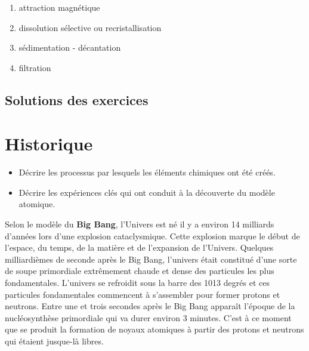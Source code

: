 \documentclass[
  11pt,
  a4paper,
  openany]{book}
\providecommand{\tightlist}{%
  \setlength{\itemsep}{0pt}\setlength{\parskip}{0pt}}
\begin{document}
\begin{Answer}

\begin{enumerate}
\def\labelenumi{\arabic{enumi}.}
\tightlist
\item
  attraction magnétique
\item
  dissolution sélective ou recristallisation
\item
  sédimentation - décantation
\item
  filtration
\end{enumerate}

\end{Answer}

\newpage

\section{Solutions des exercices} \shipoutAnswer

\chapter{Historique}\label{historique}

\begin{objectives}

\begin{itemize}
\tightlist
\item
  Décrire les processus par lesquels les éléments chimiques ont été créés.
\item
  Décrire les expériences clés qui ont conduit à la découverte du modèle atomique.
\end{itemize}

\end{objectives}

Selon le modèle du \textbf{Big Bang}, l'Univers est né il y a environ 14 milliards d'années lors d'une explosion cataclysmique. Cette explosion marque le début de l'espace, du temps, de la matière et de l'expansion de l'Univers. Quelques milliardièmes de seconde après le Big Bang, l'univers était constitué d'une sorte de soupe primordiale extrêmement chaude et dense des particules les plus fondamentales. L'univers se refroidit sous la barre des 1013 degrés et ces particules fondamentales commencent à s'assembler pour former protons et neutrons. Entre une et trois secondes après le Big Bang apparaît l'époque de la nucléosynthèse primordiale qui va durer environ 3 minutes. C'est à ce moment que se produit la formation de noyaux atomiques à partir des protons et neutrons qui étaient jusque-là libres.
\end{document}
